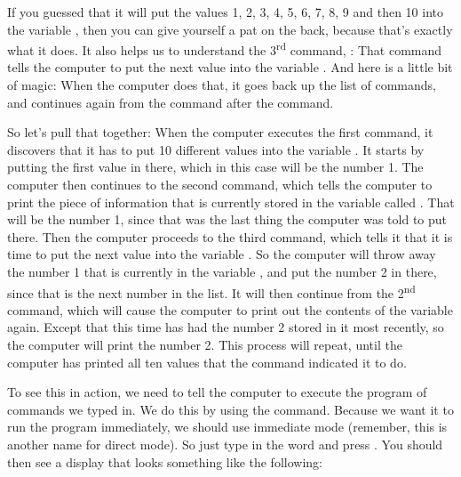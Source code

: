 If you guessed
that it will put the values 1, 2, 3, 4, 5, 6, 7, 8, 9 and then 10 into the variable , then you
can give yourself a pat on the back, because that's exactly what it does.  It also helps us to
understand the 3\textsuperscript{rd} command, : That command tells the computer to put the next value into
the variable .  And here is a little bit of magic: When the computer does that, it goes back
up the list of commands, and continues again from the command after the  command.

So let's pull that together: When the computer executes the first command, it discovers that it has
to put 10 different values into the variable . It starts by putting the first value in there, which
in this case will be the number 1.
The computer then continues to the second command, which tells the computer to print the piece of
information that is currently stored in the variable called . That will be the number 1, since
that was the last thing the computer was told to put there.  Then the computer proceeds to the
third command, which tells it that it is time to put the next value into the variable .  So the
computer will throw away the number 1 that is currently in the variable , and put the number 2 in
there, since that is the next number in the list.  It will then continue from the 2\textsuperscript{nd} command,
which will cause the computer to print out the contents of the variable  again.  Except that this
time  has had the number 2 stored in it most recently, so the computer will print the number 2.
This process will repeat, until the computer has printed all ten values that the  command
indicated it to do.

\needspace{4cm} %
To see this in action, we need to tell the computer to execute the program of commands we typed in.
We do this by using the  command. Because we want it to run the program immediately, we
should use immediate mode (remember, this is another name for direct mode).
So just type in the word  and press .  You should then see a display
that looks something like the following:


